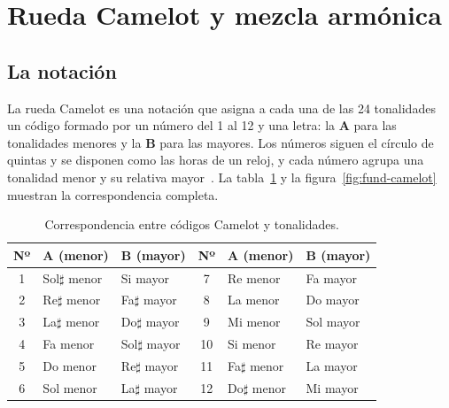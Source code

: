 \section{Rueda Camelot y mezcla armónica}
\label{sec:fund-camelot}

\subsection{La notación}

La rueda Camelot es una notación que asigna a cada una de las 24 tonalidades un código formado por un número del 1 al 12 y una letra: la \textbf{A} para las tonalidades menores y la \textbf{B} para las mayores. Los números siguen el círculo de quintas y se disponen como las horas de un reloj, y cada número agrupa una tonalidad menor y su relativa mayor~\cite{mixedinkey_camelot}. La tabla~\ref{tab:fund-camelot} y la figura~\ref{fig:fund-camelot} muestran la correspondencia completa.

\begin{table}[htbp]
  \centering
  \caption{Correspondencia entre códigos Camelot y tonalidades.}
  \label{tab:fund-camelot}
  \small
  \begin{tabular}{|c|l|l||c|l|l|}
    \hline
    \textbf{Nº} & \textbf{A (menor)} & \textbf{B (mayor)} & \textbf{Nº} & \textbf{A (menor)} & \textbf{B (mayor)} \\
    \hline
    1  & Sol$\sharp$ menor & Si mayor     & 7  & Re menor    & Fa mayor   \\
    2  & Re$\sharp$ menor  & Fa$\sharp$ mayor & 8  & La menor    & Do mayor   \\
    3  & La$\sharp$ menor  & Do$\sharp$ mayor & 9  & Mi menor    & Sol mayor  \\
    4  & Fa menor          & Sol$\sharp$ mayor & 10 & Si menor    & Re mayor   \\
    5  & Do menor          & Re$\sharp$ mayor  & 11 & Fa$\sharp$ menor & La mayor  \\
    6  & Sol menor         & La$\sharp$ mayor  & 12 & Do$\sharp$ menor & Mi mayor  \\
    \hline
  \end{tabular}
\end{table}

